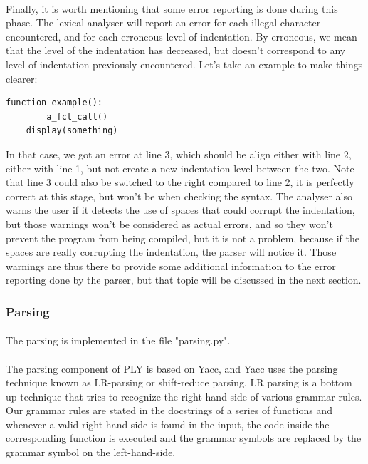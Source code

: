 \documentclass[12pt,a4paper]{article}
\begin{document}
\paragraph{}
Finally, it is worth mentioning that some error reporting is done during this phase. The lexical analyser will report an error for each illegal character encountered, and for each erroneous level of indentation. By erroneous, we mean that the level of the indentation has decreased, but doesn't correspond to any level of indentation previously encountered. Let's take an example to make things clearer:
\begin{lstlisting}
function example():
		a_fct_call()
	display(something)
\end{lstlisting}
In that case, we got an error at line 3, which should be align either with line 2, either with line 1, but not create a new indentation level between the two. Note that line 3 could also be switched to the right compared to line 2, it is perfectly correct at this stage, but won't be when checking the syntax. The analyser also warns the user if it detects the use of spaces that could corrupt the indentation, but those warnings won't be considered as actual errors, and so they won't prevent the program from being compiled, but it is not a problem, because if the spaces are really corrupting the indentation, the parser will notice it. Those warnings are thus there to provide some additional  information to the error reporting done by the parser, but that topic will be discussed in the next section.
  
\subsubsection{Parsing}

\paragraph{}
The parsing is implemented in the file "parsing.py".

\paragraph{}
The parsing component of PLY is based on Yacc, and Yacc uses the parsing technique known as LR-parsing or shift-reduce parsing. LR parsing is a bottom up technique that tries to recognize the right-hand-side of various grammar rules. Our grammar rules are stated in the docstrings of a series of functions and whenever a valid right-hand-side is found in the input, the code inside the corresponding function is executed and the grammar symbols are replaced by the grammar symbol on the left-hand-side.
\end{document}
